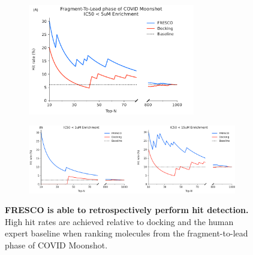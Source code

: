 
\begin{figure}[!th]
    \centering
   
    \begin{subfigure}{\textwidth}
    \centering
    \includegraphics[width=0.8\textwidth]{Chapters/Fresco/Figs/fresco_vs_moonshot_break_5uM.pdf}
    \end{subfigure}
    \hfill
   
    \begin{subfigure}{\textwidth}
    \centering
    \includegraphics[width=1.0\textwidth]{Chapters/Fresco/Figs/fresco_sensitivity.png}
    \end{subfigure}
    \caption{\textbf{FRESCO is able to retrospectively perform hit detection.} High hit rates are achieved relative to docking and the human expert baseline when ranking molecules from the fragment-to-lead phase of COVID Moonshot.}
    \label{fig:moonshot_enrichment_vs_docking}
\end{figure}

